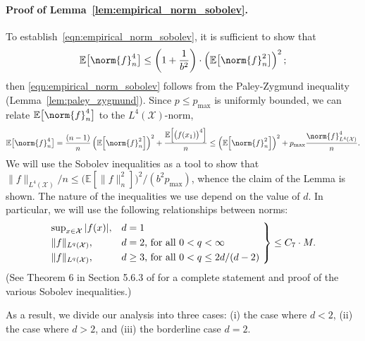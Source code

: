 \documentclass[twoside]{article}
\newcommand{\1}{\mathbf{1}}
\newcommand{\Xset}{\mathcal{X}}
\newcommand{\Leb}{L}
\newcommand{\mc}[1]{\mathcal{#1}}
\theoremstyle{definition}
\theoremstyle{remark}
\begin{document}
\paragraph{Proof of Lemma~\ref{lem:empirical_norm_sobolev}.}
To establish~\eqref{eqn:empirical_norm_sobolev}, it is sufficient to show that
\begin{equation*}
\mathbb{E}\bigl[\norm{f}_n^4\bigr] \leq \left(1 + \frac{1}{b^2}\right)\cdot \left(\mathbb{E}\bigl[\norm{f}_n^2\bigr]\right)^2;
\end{equation*}
then \eqref{eqn:empirical_norm_sobolev} follows from the Paley-Zygmund inequality (Lemma~\ref{lem:paley_zygmund}). Since $p \leq p_{\max}$ is uniformly bounded, we can relate $\mathbb{E}\bigl[\norm{f}_n^4\bigr]$ to the $\Leb^4(\Xset)$-norm,
\begin{equation*}
\mathbb{E}\bigl[\norm{f}_n^4\bigr] = \frac{(n-1)}{n}\left(\mathbb{E}\Bigl[\norm{f}_n^2\Bigr]\right)^2 + \frac{\mathbb{E}\Bigl[\bigl(f(x_1)\bigr)^4\Bigr]}{n} \leq \left(\mathbb{E}\Bigl[\norm{f}_n^2\Bigr]\right)^2 + p_{\max}\frac{\norm{f}_{\Leb^4(\Xset)}^4}{n}.
\end{equation*}
We will use the Sobolev inequalities as a tool to show that $\|f\|_{\Leb^4(\Xset)}/n \leq \bigl(\mathbb{E}[\|f\|_n^2]\bigr)^2/(b^2p_{\max})$, whence the claim of the Lemma is shown. The nature of the inequalities we use depend on the value of $d$. In particular, we will use the following relationships between norms: 
\begin{equation*}
\begin{rcases*}
\sup_{x \in \mc{X}}|f(x)|,& \textrm{$d = 1$}\\
\|f\|_{\Leb^{q}(\mc{X})},& \textrm{$d = 2$, for all $0 < q < \infty$} \\
\|f\|_{\Leb^{q}(\mc{X})},& \textrm{$d \geq 3$, for all $0 < q \leq 2d/(d - 2)$}
\end{rcases*}
\leq C_7 \cdot M.
\end{equation*}
(See Theorem 6 in Section 5.6.3 of \citet{evans10} for a complete statement and proof of the various Sobolev inequalities.)

As a result, we divide our analysis into three cases: (i) the case where $d < 2$, (ii) the case where $d > 2$, and (iii) the borderline case $d = 2$.
\end{document}
